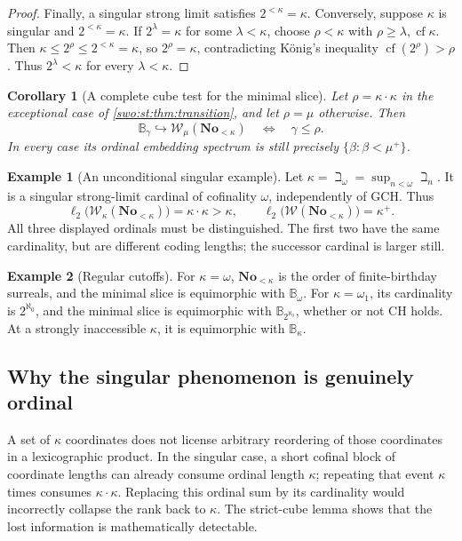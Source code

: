 \documentclass[11pt]{article}
\newtheorem{corollary}[corollary]{Corollary}
\theoremstyle{definition}
\newtheorem{example}[example]{Example}
\theoremstyle{remark}
\newcommand{\No}{\mathbf{No}}
\newcommand{\WO}{\mathcal W}
\newcommand{\BB}{\mathbb B}
\newcommand{\cf}{\operatorname{cf}}
\newcommand{\bl}{\ell_2}
\newcommand{\emb}{\hookrightarrow}
\begin{document}
\begin{proof}
Finally, a singular strong limit satisfies $2^{<\kappa}=\kappa$.
Conversely, suppose $\kappa$ is singular and $2^{<\kappa}=\kappa$.
If $2^\lambda=\kappa$ for some $\lambda<\kappa$, choose
$\rho<\kappa$ with $\rho\geq\lambda,\cf\kappa$. Then
$\kappa\leq2^\rho\leq2^{<\kappa}=\kappa$, so $2^\rho=\kappa$,
contradicting König's inequality $\cf(2^\rho)>\rho$.
Thus $2^\lambda<\kappa$ for every $\lambda<\kappa$.
\end{proof}

\begin{corollary}[A complete cube test for the minimal slice]\label{swo:st:n10.4}
Let $\rho=\kappa\cdot\kappa$ in the exceptional case of
\cref{swo:st:thm:transition}, and let $\rho=\mu$ otherwise. Then
\[
 \BB_\gamma\emb\WO_\mu(\No_{<\kappa})
 \quad\Longleftrightarrow\quad\gamma\leq\rho.
\]
In every case its ordinal embedding spectrum is still precisely
$\{\beta:\beta<\mu^+\}$.
\end{corollary}

\begin{example}[An unconditional singular example]\label{swo:st:n10.5}
Let $\kappa=\beth_\omega=\sup_{n<\omega}\beth_n$. It is a singular
strong-limit cardinal of cofinality $\omega$, independently of GCH.
Thus
\[
 \bl\bigl(\WO_\kappa(\No_{<\kappa})\bigr)=\kappa\cdot\kappa>
 \kappa,\qquad
 \bl\bigl(\WO(\No_{<\kappa})\bigr)=\kappa^+.
\]
All three displayed ordinals must be distinguished. The first two have
the same cardinality, but are different coding lengths; the successor
cardinal is larger still.
\end{example}

\begin{example}[Regular cutoffs]\label{swo:st:n10.6}
For $\kappa=\omega$, $\No_{<\kappa}$ is the order of finite-birthday surreals,
and the minimal slice is equimorphic with $\BB_\omega$.
For $\kappa=\omega_1$, its cardinality is $2^{\aleph_0}$, and the
minimal slice is equimorphic with $\BB_{2^{\aleph_0}}$, whether or not
CH holds. At a strongly inaccessible $\kappa$, it is equimorphic with
$\BB_\kappa$.
\end{example}

\subsection{Why the singular phenomenon is genuinely ordinal}

A set of $\kappa$ coordinates does not license arbitrary reordering of
those coordinates in a lexicographic product. In the singular case, a
short cofinal block of coordinate lengths can already consume ordinal
length $\kappa$; repeating that event $\kappa$ times consumes
$\kappa\cdot\kappa$. Replacing this ordinal sum by its cardinality would
incorrectly collapse the rank back to $\kappa$. The strict-cube lemma
shows that the lost information is mathematically detectable.
\end{document}
